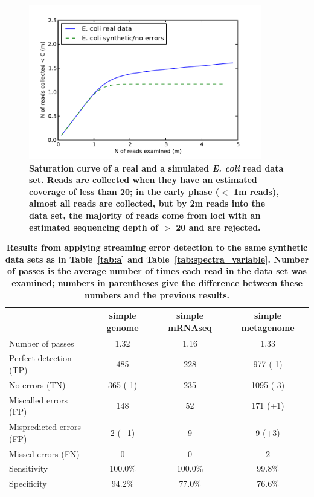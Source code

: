 \documentclass{article}
\begin{document}
\begin{figure}[!ht]
 \centerline{\includegraphics[width=4in]{./figures/saturation}}
\caption{\bf Saturation curve of a real and a simulated {\em E. coli}
  read data set.  Reads are collected when they have an estimated
  coverage of less than 20; in the early phase ($<$ 1m reads), almost
  all reads are collected, but by 2m reads into the data set, the
  majority of reads come from loci with an estimated sequencing depth
  of $>$ 20 and are rejected.}
\label{fig:saturation}
\end{figure}


\begin{table}
\centering
\begin{tabular}{|l|c||c||c|}
\hline
& {\bf simple genome}     & {\bf simple mRNAseq} & {\bf simple metagenome} \\
\hline
Number of passes & 1.32 & 1.16 & 1.33 \\
\hline
Perfect detection (TP)    & 485                 & 228     & 977 (-1) \\
No errors (TN)            & 365 (-1)            & 235     & 1095 (-3) \\
Miscalled errors (FP)     & 148                 & 52      & 171 (+1) \\
Mispredicted errors (FP)  & 2 (+1)              & 9       & 9 (+3) \\
Missed errors (FN)        & 0                   & 0       & 2 \\
\hline
Sensitivity               & 100.0\%             & 100.0\% & 99.8\% \\
Specificity               & 94.2\%              & 77.0\%  & 76.6\% \\
\hline
\end{tabular}
\caption{{\bf Results from applying streaming error detection to the
    same synthetic data sets as in Table~\ref{tab:a} and
    Table~\ref{tab:spectra_variable}.  Number of passes is the average
    number of times each read in the data set was examined; numbers in
    parentheses give the difference between these numbers and the
    previous results.}}
\label{tab:spectra_streaming}

\end{table}
\end{document}

